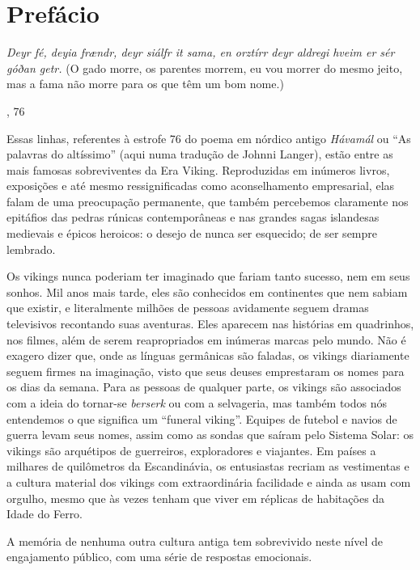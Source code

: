 \chapter[Prefácio, \emph{por Neil Price}]{Prefácio}\label{prefuxe1cio}

\epigraph{\emph{%
Deyr fé, deyia frændr, deyr siálfr it sama, en orztírr deyr aldregi
hveim er sér góðan getr.}\linebreak
(O gado morre, os parentes morrem, eu vou morrer do mesmo jeito, mas a
fama não morre para os que têm um bom nome.)}{, 76}

Essas linhas, referentes à estrofe 76 do poema em nórdico antigo
\emph{Hávamál} ou ``As palavras do altíssimo'' (aqui numa tradução de
Johnni Langer), estão entre as mais famosas sobreviventes 
da Era Viking. Reproduzidas em inúmeros livros, exposições e
até mesmo ressignificadas como aconselhamento empresarial, elas falam de
uma preocupação permanente, que também percebemos claramente nos
epitáfios das pedras rúnicas contemporâneas e nas grandes sagas
islandesas medievais e épicos heroicos: o desejo de nunca ser esquecido; de ser sempre lembrado.

Os vikings nunca poderiam ter imaginado que fariam tanto sucesso,
nem em seus sonhos. Mil anos mais tarde, eles são conhecidos em
continentes que nem sabiam que existir, e literalmente milhões
de pessoas avidamente seguem dramas televisivos recontando suas
aventuras. Eles aparecem nas histórias em quadrinhos, nos filmes, além de serem
reapropriados em inúmeras marcas pelo mundo. Não é exagero dizer que,
onde as línguas germânicas são faladas, os vikings diariamente seguem
firmes na imaginação, visto que seus deuses emprestaram os nomes para os
dias da semana. Para as pessoas de qualquer parte, os vikings são
associados com a ideia do tornar-se \emph{berserk} ou com a selvageria, mas também
todos nós entendemos o que significa um ``funeral viking''. Equipes de
futebol e navios de guerra levam seus nomes, assim como as sondas que
saíram pelo Sistema Solar: os vikings são arquétipos de guerreiros,
exploradores e viajantes. Em países a milhares de quilômetros da
Escandinávia, os entusiastas recriam as vestimentas e a cultura material
dos vikings com extraordinária facilidade e ainda as usam com orgulho,
mesmo que às vezes tenham que viver em réplicas de habitações da Idade
do Ferro.

A memória de nenhuma outra cultura antiga tem sobrevivido neste nível de
engajamento público, com uma série de respostas emocionais.

